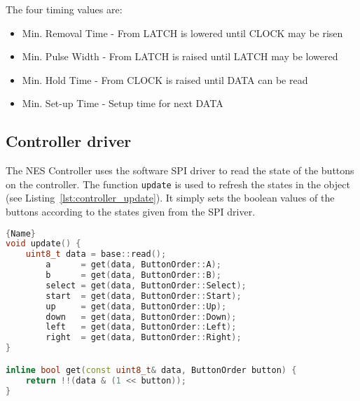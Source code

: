 The four timing values are:
\begin{itemize}
	\item Min. Removal Time - From LATCH is lowered until CLOCK may be risen
	\item Min. Pulse Width - From LATCH is raised until LATCH may be lowered
	\item Min. Hold Time - From CLOCK is raised until DATA can be read
	\item Min. Set-up Time - Setup time for next DATA
\end{itemize}

\subsection{Controller driver}

The NES Controller uses the software SPI driver to read the state of the buttons on the controller. The function \texttt{update} is used to refresh the states in the object (see Listing~\ref{lst:controller_update}). It simply sets the boolean values of the buttons according to the states given from the SPI driver.

\begin{lstlisting}[caption={Updating the state of the controller},label={lst:controller_update},frame=tlrb, language=C++]{Name}
void update() {
    uint8_t data = base::read();
		a      = get(data, ButtonOrder::A);
		b      = get(data, ButtonOrder::B);
		select = get(data, ButtonOrder::Select);
		start  = get(data, ButtonOrder::Start);
		up     = get(data, ButtonOrder::Up);
		down   = get(data, ButtonOrder::Down);
		left   = get(data, ButtonOrder::Left);
		right  = get(data, ButtonOrder::Right);
}

inline bool get(const uint8_t& data, ButtonOrder button) {
    return !!(data & (1 << button));
}
\end{lstlisting}

